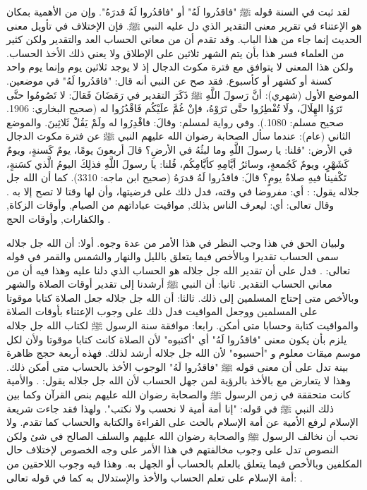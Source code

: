 لقد ثبت في السنة قوله ﷺ "فاقدُروا لَهُ" أو "فاقدُروا لَهُ قدرَهُ". وإن من الأهمية بمكان هو الإعتناء في تقرير معنى التقدير الذي دل عليه النبي ﷺ. فإن الإختلاف في تأويل معنى الحديث إنما جاء من هذا الباب. وقد تقدم أن من معاني الحساب العد والتقدير ولكن كثير من العلماء فسر هذا بأن يتم الشهر ثلاثين على الإطلاق ولا يعني ذلك الأخذ الحساب. ولكن هذا المعنى لا يتوافق مع فترة مكوث الدجال إذ لا يوجد ثلاثين يوم وإنما يوم واحد كسنة أو كشهر أو كأسبوع. فقد صح عن النبي أنه قال: "فاقدُروا لَهُ" في موضعين. الموضع الأول (شهري): 
أنَّ رَسولَ اللَّهِ ﷺ ذَكَرَ التقدير في رَمَضَانَ فَقالَ: لا تَصُومُوا حتَّى تَرَوُا الهِلَالَ، ولَا تُفْطِرُوا حتَّى تَرَوْهُ، فإنْ غُمَّ علَيْكُم فَاقْدُرُوا له (صحيح البخاري: 1906. صحيح مسلم: 1080.). وفي رواية لمسلم: وقالَ: فاقْدِرُوا له ولَمْ يَقُلْ ثَلاثِينَ. والموضع الثاني (عام): عندما سأل الصحابة رضوان الله عليهم النبي ﷺ عن فترة مكوث الدجال في الأرض: "قلنا: يا رسولَ اللَّهِ وما لبثُهُ في الأرضِ؟ قالَ أربعونَ يومًا، يومٌ كَسنةٍ، ويومٌ كَشَهْرٍ، ويومٌ كَجُمعةٍ، وسائرُ أيَّامِهِ كأيَّامِكُم، قُلنا: يا رسولَ اللَّهِ فذلِكَ اليومُ الَّذي كسَنةٍ، تَكْفينا فيهِ صلاةُ يومٍ؟ قالَ: فاقدُروا لَهُ قدرَهُ (صحيح ابن ماجه: 3310). كما أن الله جل جلاله يقول: \quranayah*[4][103][14] {\footnotesize (\surahname*[4])}:  أي: مفروضا في وقته، فدل ذلك على فرضيتها، وأن لها وقتا لا تصح إلا به \cite{tafsir_Saadi}. وقال تعالى: \quranayah*[2][189][1-8] {\footnotesize (\surahname*[2])} أي: ليعرف الناس بذلك, مواقيت عباداتهم من الصيام, وأوقات الزكاة, والكفارات, وأوقات الحج \cite{tafsir_Saadi}.

ولبيان الحق في هذا وجب النظر في هذا الأمر من عدة وجوه. أولا: أن الله جل جلاله سمى الحساب تقديرا وبالأخص فيما يتعلق بالليل والنهار والشمس والقمر في قوله تعالى: \quranayah*[6][96] {\footnotesize (\surahname*[6])}. فدل على أن تقدير الله جل جلاله هو الحساب الذي دلنا عليه وهذا فيه أن من معاني الحساب التقدير. ثانيا: أن النبي ﷺ أرشدنا إلى تقدير أوقات الصلاة والشهر وبالأخص متى إحتاج المسلمين إلى ذلك. ثالثا: أن الله جل جلاله جعل الصلاة كتابا موقوتا على المسلمين ووجعل المواقيت فدل ذلك على وجوب الإعتناء بأوقات الصلاة والمواقيت كتابة وحسابا متى أمكن. رابعا: موافقة سنة الرسول ﷺ لكتاب الله جل جلاله يلزم بأن يكون معنى "فاقدُروا لَهُ" أي "أكتبوه" لأن الصلاة كانت كتابا موقوتا ولأن لكل موسم ميقات معلوم و "أحسبوه" لأن الله جل جلاله أرشد لذلك. فهذه أربعة حجج ظاهرة بينة تدل على أن معنى قوله ﷺ "فاقدُروا لَهُ" الوجوب الأخذ بالحساب متى أمكن ذلك. وهذا لا يتعارض مع بالأخذ بالرؤية لمن جهل الحساب لأن الله جل جلاله يقول: \quranayah*[22][78][8-14] {\footnotesize (\surahname*[22])}. والأمية كانت متحققة في زمن الرسول ﷺ والصحابة رضوان الله عليهم بنص القرآن وكما بين ذلك النبي ﷺ في قوله: "إنا أمة أمية لا نحسب ولا نكتب". ولهذا فقد جاءت شريعة الإسلام لرفع الأمية عن أمة الإسلام بالحث على القراءة والكتابة والحساب كما تقدم. ولا نحب أن نخالف الرسول ﷺ والصحابة رضوان الله عليهم والسلف الصالح في شئ ولكن النصوص تدل على وجوب مخالفتهم في هذا الأمر على وجه الخصوص لإختلاف حال المكلفين وبالأخص فيما يتعلق بالعلم بالحساب أو الجهل به. وهذا فيه وجوب اللاحقين من أمة الإسلام على تعلم الحساب والأخذ والإستدلال به كما في قوله تعالى: \quranayah*[10][5] {\footnotesize (\surahname*[10])}.

